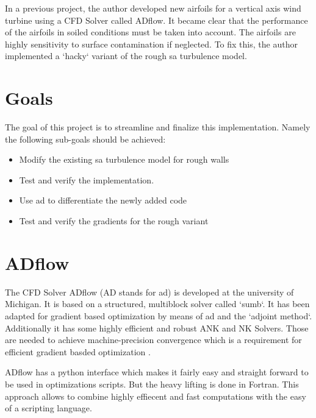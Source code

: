 In a previous project, the author developed new airfoils for a vertical axis
wind turbine \cite{awp} using a CFD Solver called ADflow. It became clear that
the performance of the airfoils in soiled conditions must be taken into
account. The airfoils are highly sensitivity to surface contamination if
neglected. To fix this, the author implemented a `hacky` variant of the rough
\gls{sa} turbulence model.


\section{Goals}
The goal of this project is to streamline and finalize this implementation.
Namely the following sub-goals should be achieved:

\begin{itemize}
  \item Modify the existing \gls{sa} turbulence model for rough walls
  \item Test and verify the implementation.
  \item Use \gls{ad} to differentiate the newly added code
  \item Test and verify the gradients for the rough variant
\end{itemize}


\section{ADflow}
The CFD Solver ADflow (AD stands for \Gls{ad}) is developed at the university of
Michigan. It is based on a structured, multiblock solver called `sumb`. It has
been adapted for gradient based optimization by means of \gls{ad} and the
`adjoint method`. Additionally it has some highly efficient and robust ANK and
NK Solvers. Those are needed to achieve machine-precision convergence which is a
requirement for efficient gradient basded optimization \cite{Mader2020a}
\cite{Kenway2019a} \cite{Yildirim2019b}.

ADflow has a python interface which makes it fairly easy and straight forward to
be used in optimizations scripts. But the heavy lifting is done in Fortran. This approach allows to combine highly effiecent and fast computations with the easy of a scripting language.
